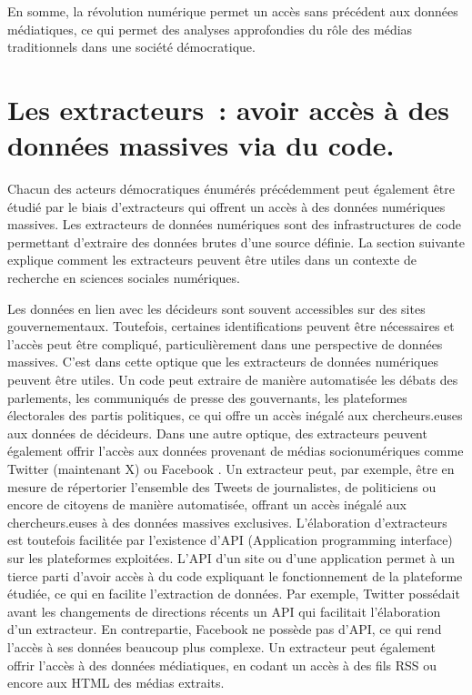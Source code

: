 \documentclass[
  letterpaper,
]{scrbook}
\begin{document}
En somme, la révolution numérique permet un accès sans précédent aux
données médiatiques, ce qui permet des analyses approfondies du rôle des
médias traditionnels dans une société démocratique.

\hypertarget{les-extracteurs-avoir-accuxe8s-uxe0-des-donnuxe9es-massives-via-du-code.}{%
\section{\texorpdfstring{\textbf{Les extracteurs~: avoir accès à des
données massives via du
code.}}{Les extracteurs~: avoir accès à des données massives via du code.}}\label{les-extracteurs-avoir-accuxe8s-uxe0-des-donnuxe9es-massives-via-du-code.}}

Chacun des acteurs démocratiques énumérés précédemment peut également
être étudié par le biais d'extracteurs qui offrent un accès à des
données numériques massives. Les extracteurs de données numériques sont
des infrastructures de code permettant d'extraire des données brutes
d'une source définie. La section suivante explique comment les
extracteurs peuvent être utiles dans un contexte de recherche en
sciences sociales numériques.

Les données en lien avec les décideurs sont souvent accessibles sur des
sites gouvernementaux. Toutefois, certaines identifications peuvent être
nécessaires et l'accès peut être compliqué, particulièrement dans une
perspective de données massives. C'est dans cette optique que les
extracteurs de données numériques peuvent être utiles. Un code peut
extraire de manière automatisée les débats des parlements, les
communiqués de presse des gouvernants, les plateformes électorales des
partis politiques, ce qui offre un accès inégalé aux chercheurs.euses
aux données de décideurs. Dans une autre optique, des extracteurs
peuvent également offrir l'accès aux données provenant de médias
socionumériques comme Twitter (maintenant X) ou Facebook . Un extracteur
peut, par exemple, être en mesure de répertorier l'ensemble des Tweets
de journalistes, de politiciens ou encore de citoyens de manière
automatisée, offrant un accès inégalé aux chercheurs.euses à des données
massives exclusives. L'élaboration d'extracteurs est toutefois facilitée
par l'existence d'API (Application programming interface) sur les
plateformes exploitées. L'API d'un site ou d'une application permet à un
tierce parti d'avoir accès à du code expliquant le fonctionnement de la
plateforme étudiée, ce qui en facilite l'extraction de données. Par
exemple, Twitter possédait avant les changements de directions récents
un API qui facilitait l'élaboration d'un extracteur. En contrepartie,
Facebook ne possède pas d'API, ce qui rend l'accès à ses données
beaucoup plus complexe. Un extracteur peut également offrir l'accès à
des données médiatiques, en codant un accès à des fils RSS ou encore aux
HTML des médias extraits.
\end{document}
